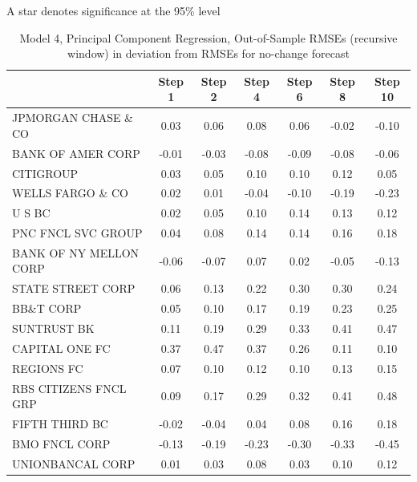 \documentclass[11pt]{article}
\begin{document}
\begin{table}
\flushleft
\footnotesize \noindent A star denotes significance at the 95\% level                                                                                                           
\end{table}                                                        




\begin{table} 
\caption{Model 4, Principal Component Regression, Out-of-Sample RMSEs (recursive window) in deviation from RMSEs for no-change forecast}                                              
\center                                                     
\begin{tabular}{|l|c|c|c|c|c|c|}                            
\hline                                                      
&Step 1 &Step 2 &Step 4 &Step 6 &Step 8 &Step 10\\          
\hline                                                      
JPMORGAN CHASE \& CO  &0.03&0.06&0.08&0.06&-0.02&-0.10\\    
BANK OF AMER CORP     &-0.01&-0.03&-0.08&-0.09&-0.08&-0.06\\
CITIGROUP             &0.03&0.05&0.10&0.10&0.12&0.05\\      
WELLS FARGO \& CO     &0.02&0.01&-0.04&-0.10&-0.19&-0.23\\  
U S BC                &0.02&0.05&0.10&0.14&0.13&0.12\\      
PNC FNCL SVC GROUP    &0.04&0.08&0.14&0.14&0.16&0.18\\      
BANK OF NY MELLON CORP&-0.06&-0.07&0.07&0.02&-0.05&-0.13\\  
STATE STREET CORP     &0.06&0.13&0.22&0.30&0.30&0.24\\      
BB\&T CORP            &0.05&0.10&0.17&0.19&0.23&0.25\\      
SUNTRUST BK           &0.11&0.19&0.29&0.33&0.41&0.47\\      
CAPITAL ONE FC        &0.37&0.47&0.37&0.26&0.11&0.10\\      
REGIONS FC            &0.07&0.10&0.12&0.10&0.13&0.15\\      
RBS CITIZENS FNCL GRP &0.09&0.17&0.29&0.32&0.41&0.48\\      
FIFTH THIRD BC        &-0.02&-0.04&0.04&0.08&0.16&0.18\\    
BMO FNCL CORP         &-0.13&-0.19&-0.23&-0.30&-0.33&-0.45\\
UNIONBANCAL CORP      &0.01&0.03&0.08&0.03&0.10&0.12\\      

\end{tabular}
\end{table}
\end{document}
